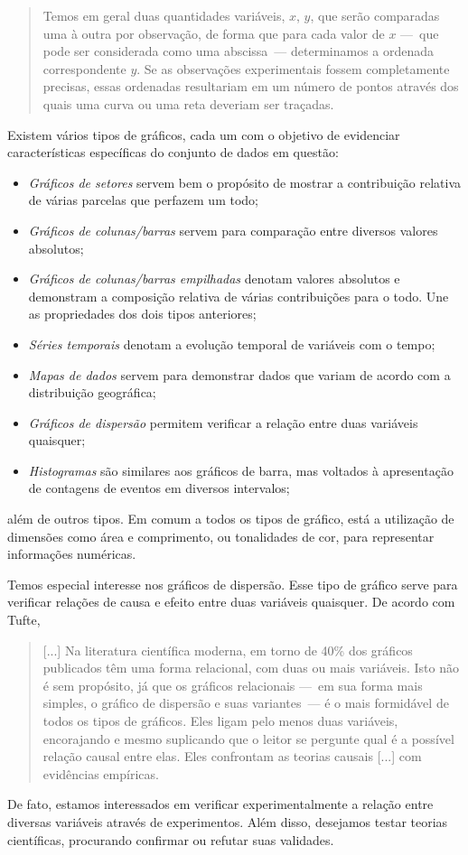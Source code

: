 \begin{quote}
	Temos em geral duas quantidades variáveis, $x$, $y$, que serão comparadas uma à outra por observação, de forma que para cada valor de $x$ ---~que pode ser considerada como uma abscissa~--- determinamos a ordenada correspondente $y$. Se as observações experimentais fossem completamente precisas, essas ordenadas resultariam em um número de pontos através dos quais uma curva ou uma reta deveriam ser traçadas. \cite{Lambert}
\end{quote}

Existem vários tipos de gráficos, cada um com o objetivo de evidenciar características específicas do conjunto de dados em questão:
\begin{itemize}
	\item \emph{Gráficos de setores} servem bem o propósito de mostrar a contribuição relativa de várias parcelas que perfazem um todo;
	\item \emph{Gráficos de colunas/barras} servem para comparação entre diversos valores absolutos;
	\item \emph{Gráficos de colunas/barras empilhadas} denotam valores absolutos e demonstram a composição relativa de várias contribuições para o todo. Une as propriedades dos dois tipos anteriores;
	\item \emph{Séries temporais} denotam a evolução temporal de variáveis com o tempo;
	\item \emph{Mapas de dados} servem para demonstrar dados que variam de acordo com a distribuição geográfica;
	\item \emph{Gráficos de dispersão} permitem verificar a relação entre duas variáveis quaisquer;
	\item \emph{Histogramas} são similares aos gráficos de barra, mas voltados à apresentação de contagens de eventos em diversos intervalos;
\end{itemize}
%
além de outros tipos. Em comum a todos os tipos de gráfico, está a utilização de dimensões como área e comprimento, ou tonalidades de cor, para representar informações numéricas.

Temos especial interesse nos gráficos de dispersão. Esse tipo de gráfico serve para verificar relações de causa e efeito entre duas variáveis quaisquer. De acordo com Tufte,
\begin{quote}
	[...] Na literatura científica moderna, em torno de 40\% dos gráficos publicados têm uma forma relacional, com duas ou mais variáveis. Isto não é sem propósito, já que os gráficos relacionais ---~em sua forma mais simples, o gráfico de dispersão e suas variantes~--- é o mais formidável de todos os tipos de gráficos. Eles ligam pelo menos duas variáveis, encorajando e mesmo suplicando que o leitor se pergunte qual é a possível relação causal entre elas. Eles confrontam as teorias causais [...] com evidências empíricas.
\end{quote}
%
De fato, estamos interessados em verificar experimentalmente a relação entre diversas variáveis através de experimentos. Além disso, desejamos testar teorias científicas, procurando confirmar ou refutar suas validades.

